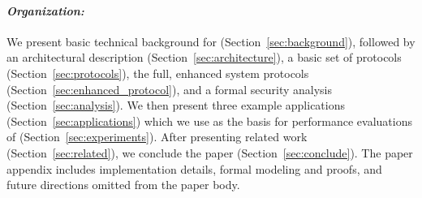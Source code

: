 \paragraph{\em Organization:} We present basic technical background for \tc (Section~\ref{sec:background}), followed by an architectural description (Section~\ref{sec:architecture}), a basic set of protocols (Section~\ref{sec:protocols}), the full, enhanced system protocols (Section~\ref{sec:enhanced_protocol}), and a formal security analysis (Section~\ref{sec:analysis}). We then present three example applications (Section~\ref{sec:applications}) which we use as the basis for performance evaluations of \tc (Section~\ref{sec:experiments}).  After presenting related work (Section~\ref{sec:related}), we conclude the paper (Section~\ref{sec:conclude}). The paper appendix includes implementation details, formal modeling and proofs, and future directions omitted from the paper body.





